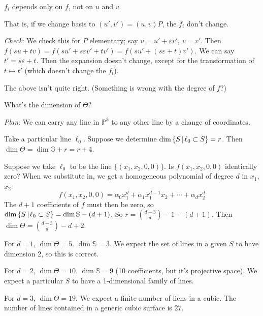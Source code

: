 \documentclass [letterpaper,11pt,twoside]{article}
\begin{document}
    \begin{lem*}
      $f_i$ depends only on $f$, not on $u$ and $v$.

      That is, if we change basis to $(u', v') = (u, v)P$, the $f_i$ don't change.
    \end{lem*}
    \emph{Check}: We check this for $P$ elementary; say $u = u' + \varepsilon v'$, $v = v'$.  Then $f(su + tv) = f(su' + s\varepsilon v' + tv') = f(su' + (s\varepsilon + t)v')$.  We can say $t' = s\varepsilon + t$.  Then the expansion doesn't change, except for the transformation of $t \mapsto t'$ (which doesn't change the $f_i$).

    The above isn't quite right.  (Something is wrong with the degree of $f$?)

    What's the dimension of $\Theta$?

    \emph{Plan}: We can carry any line in $\mathbb P^3$ to any other line by a change of coordinates.

    Take a particular line $\ell_0$.  Suppose we determine $\dim\mathset[S]{\ell_0\subset S} = r$.  Then $\dim\Theta = \dim \mathbb G + r = r + 4$.

    Suppose we take $\ell_0$ to be the line $\{(x_1, x_2, 0, 0)\}$.  Is $f(x_1, x_2, 0, 0)$ identically zero?  When we substitute in, we get a homogeneous polynomial of degree $d$ in $x_1$, $x_2$:
    $$f(x_1, x_2, 0, 0) = \alpha_0 x_1^d + \alpha_1 x_1^{d-1}x_2 + \cdots + \alpha_d x_2^d$$
    The $d + 1$ coefficients of $f$ must then be zero, so $\dim\mathset[S]{\ell_0 \subset S} = \dim \mathbb S - (d+1)$.  So $r = \binom{d+3}{d} - 1 - (d+1)$.  Then $\dim\Theta = \binom{d+3}{d} - d + 2$.

    For $d = 1$, $\dim\Theta = 5$.  $\dim \mathbb S = 3$.  We expect the set of lines in a given $S$ to have dimension 2, so this is correct.

    For $d = 2$, $\dim\Theta = 10$.  $\dim \mathbb S = 9$ (10 coefficients, but it's projective space).  We expect a particular $S$ to have a 1-dimensional family of lines.

    For $d = 3$, $\dim\Theta = 19$.  We expect a finite number of liens in a cubic.  The number of lines contained in a generic cubic surface is 27.
\end{document}
